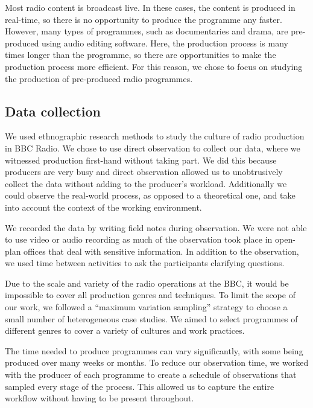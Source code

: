 Most radio content is broadcast live. In these cases, the content is produced in real-time, so there is no opportunity
to produce the programme any faster. However, many types of programmes, such as documentaries and drama, are
pre-produced using audio editing software. Here, the production process is many times longer than the programme, so
there are opportunities to make the production process more efficient.  For this reason, we chose to focus on studying
the production of pre-produced radio programmes.

\subsection{Data collection}
We used ethnographic research methods to study the culture of radio production in BBC Radio. We chose to use direct
observation to collect our data, where we witnessed production first-hand without taking part.  We did this because
producers are very busy and direct observation allowed us to unobtrusively collect the data without adding to the
producer's workload. Additionally we could observe the real-world process, as opposed to a theoretical one, and take
into account the context of the working environment.

We recorded the data by writing field notes during observation. We were not able to use video or audio recording as
much of the observation took place in open-plan offices that deal with sensitive information. In addition to the
observation, we used time between activities to ask the participants clarifying questions.

Due to the scale and variety of the radio operations at the BBC, it would be impossible to cover all production genres
and techniques. To limit the scope of our work, we followed a ``maximum variation sampling'' strategy \citep[p.
172]{Patton1990} to choose a small number of heterogeneous case studies. We aimed to select programmes of different
genres to cover a variety of cultures and work practices.

The time needed to produce programmes can vary significantly, with some being produced over many weeks or months. To
reduce our observation time, we worked with the producer of each programme to create a schedule of observations that
sampled every stage of the process. This allowed us to capture the entire workflow without having to be present
throughout.

